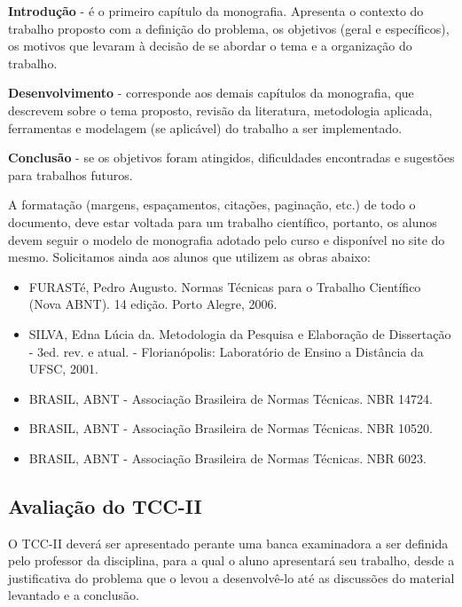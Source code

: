 \textbf{Introdu\c{c}\~{a}o} - \'{e} o primeiro cap\'{i}tulo da monografia. Apresenta o contexto do trabalho proposto com a defini\c{c}\~{a}o do problema, os objetivos (geral e espec\'{i}ficos), os motivos que levaram \`{a} decis\~{a}o de se abordar o tema e a organiza\c{c}\~{a}o do trabalho.

\textbf{Desenvolvimento} - corresponde aos demais cap\'{i}tulos da monografia, que descrevem sobre o tema proposto, revis\~{a}o da literatura, metodologia aplicada, ferramentas e modelagem (se aplic\'{a}vel) do trabalho a ser implementado.

\textbf{Conclus\~{a}o} - se os objetivos foram atingidos, dificuldades encontradas e sugest\~{o}es para trabalhos futuros.

A formata\c{c}\~{a}o (margens, espa\c{c}amentos, cita\c{c}\~{o}es, pagina\c{c}\~{a}o, etc.) de todo o documento, deve estar voltada para um trabalho cient\'{i}fico, portanto, 
os alunos devem seguir o modelo de monografia adotado pelo curso e dispon\'{i}vel no site do mesmo. 
Solicitamos ainda aos alunos que utilizem as obras abaixo:

	\begin{itemize}	
		\item  FURAST\'{e}, Pedro Augusto. Normas T\'{e}cnicas para o Trabalho Cient\'{i}fico (Nova ABNT). 14 edi\c{c}\~{a}o. Porto Alegre, 2006.

		\item SILVA, Edna L\'{u}cia da. Metodologia da Pesquisa e Elabora\c{c}\~{a}o de Disserta\c{c}\~{a}o - 3ed. rev. e atual. - Florian\'{o}polis: Laborat\'{o}rio de Ensino a Dist\^{a}ncia da 			UFSC, 2001.

		\item BRASIL, ABNT - Associa\c{c}\~{a}o Brasileira de Normas T\'{e}cnicas. NBR 14724.

		\item BRASIL, ABNT - Associa\c{c}\~{a}o Brasileira de Normas T\'{e}cnicas. NBR 10520.

		\item BRASIL, ABNT - Associa\c{c}\~{a}o Brasileira de Normas T\'{e}cnicas. NBR 6023.
	\end{itemize}


\subsection{Avalia\c{c}\~{a}o do TCC-II}

O TCC-II dever\'{a} ser apresentado perante uma banca examinadora a ser definida pelo professor da disciplina, para a qual o aluno apresentar\'{a} seu trabalho, desde a justificativa do problema que o levou a desenvolv\^{e}-lo at\'{e} as discuss\~{o}es do material levantado e a conclus\~{a}o.

